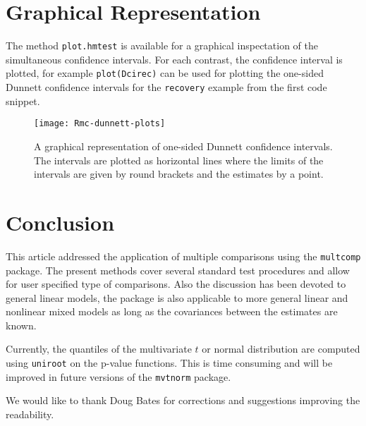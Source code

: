 \documentclass{article}
\begin{document}
\section{Graphical Representation}

The method \texttt{plot.hmtest} is available for a graphical inspectation of
the simultaneous confidence intervals. For each contrast, the confidence
interval is plotted, for example \texttt{plot(Dcirec)} can be used for
plotting the one-sided Dunnett confidence intervals for the \texttt{recovery}
example from the first code snippet.
\begin{figure}
\begin{center}
\texttt{[image: Rmc-dunnett-plots]}
\caption{A graphical representation of one-sided Dunnett confidence
intervals. The intervals are plotted as horizontal lines where the 
limits of the intervals are given by round brackets and the
estimates by a point.}
\end{center}
\end{figure}

\section{Conclusion} 
This article addressed the application of 
multiple comparisons using the \texttt{multcomp} package. The 
present methods cover several standard test procedures and allow 
for user specified type of comparisons. Also the discussion  has 
been devoted to general linear models, the package is also 
applicable to more general linear and nonlinear mixed models as 
long as the covariances between the estimates are known.

Currently, the quantiles of the multivariate $t$ or normal distribution are
computed using \texttt{uniroot} on the p-value functions. This is time
consuming and will be improved in future versions of the \texttt{mvtnorm}
package.

We would like to thank Doug Bates for corrections and
suggestions improving the readability.



\end{document}
